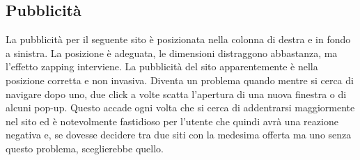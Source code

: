 \subsection{Pubblicità} \label{Pubblicità}
La pubblicità per il seguente sito è posizionata nella colonna di destra e in fondo a sinistra. La posizione è adeguata, le dimensioni distraggono abbastanza, ma l'effetto zapping interviene. La pubblicità del sito apparentemente è nella posizione corretta e non invasiva. Diventa un problema quando mentre si cerca di navigare dopo uno, due click a volte scatta l'apertura di una nuova finestra o di alcuni pop-up. Questo accade ogni volta che si cerca di addentrarsi maggiormente nel sito ed è notevolmente fastidioso per l'utente che quindi avrà una reazione negativa e, se dovesse decidere tra due siti con la medesima offerta ma uno senza questo problema, sceglierebbe quello. 